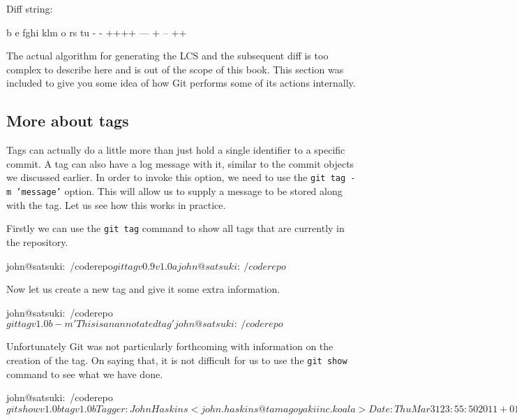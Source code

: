 Diff string:
\begin{code}
b e fghi klm o rs tu
- - ++++ --- + -- ++
\end{code}

The actual algorithm for generating the LCS and the subsequent diff is too complex to describe here and is out of the scope of this book.
This section was included to give you some idea of how Git performs some of its actions internally.

\subsection{More about tags}
Tags can actually do a little more than just hold a single identifier to a specific commit.
A tag can also have a log message with it, similar to the commit objects we discussed earlier.
In order to invoke this option, we need to use the \texttt{git tag -m 'message'} option.
This will allow us to supply a message to be stored along with the tag.
Let us see how this works in practice.

Firstly we can use the \texttt{git tag} command to show all tags that are currently in the repository.

\begin{code}
john@satsuki:~/coderepo$ git tag
v0.9
v1.0a
john@satsuki:~/coderepo$
\end{code}

Now let us create a new tag and give it some extra information.
\begin{code}
john@satsuki:~/coderepo$ git tag v1.0b -m 'This is an annotated tag'
john@satsuki:~/coderepo$
\end{code}

Unfortunately Git was not particularly forthcoming with information on the creation of the tag.
On saying that, it is not difficult for us to use the \texttt{git show} command to see what we have done.

\begin{code}
john@satsuki:~/coderepo$ git show v1.0b
tag v1.0b
Tagger: John Haskins <john.haskins@tamagoyakiinc.koala>
Date:   Thu Mar 31 23:55:50 2011 +0100

This is an annotated tag

commit a022d4d1edc69970b4e8b3fe1da3dccd943a55e4
Author: John Haskins <john.haskins@tamagoyakiinc.koala>
Date:   Thu Mar 31 22:05:55 2011 +0100

    Messed with a few files

diff --git a/my_second_committed_file b/my_second_committed_file
index 095b9cd..c9887f8 100644
--- a/my_second_committed_file
+++ b/my_second_committed_file
@@ -1,2 +1 @@
-Change1
-Change2
+Changed this file completely
diff --git a/my_third_committed_file b/my_third_committed_file
new file mode 100644
index 0000000..5d27866
--- /dev/null
+++ b/my_third_committed_file
@@ -0,0 +1 @@
+Addition to the line
john@satsuki:~/coderepo$
\end{code}


